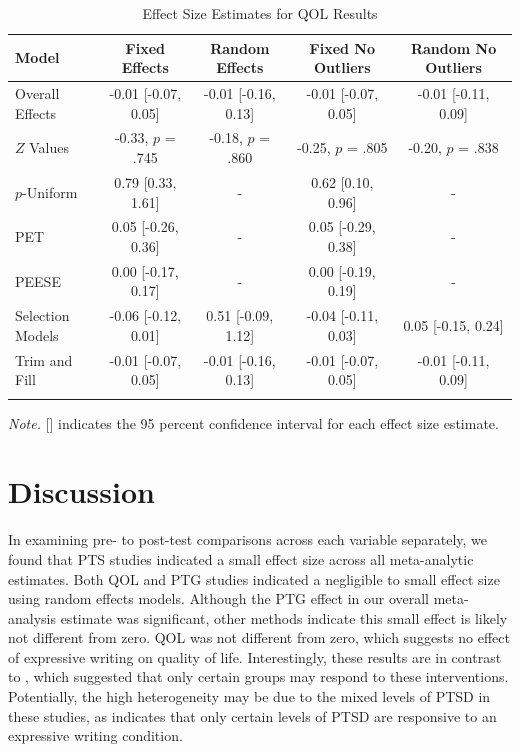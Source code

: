\documentclass[english,man]{apa6}
\theoremstyle{definition}
\theoremstyle{definition}
\theoremstyle{definition}
\theoremstyle{remark}
\begin{document}
\begin{table}[tbp]
\begin{center}
\begin{threeparttable}
\caption{\label{tab:QOLtable}Effect Size Estimates for QOL Results}
\small{
\begin{tabular}{lcccc}
\toprule
Model & Fixed Effects & Random Effects & Fixed No Outliers & Random No Outliers\\
\midrule
Overall Effects & -0.01 [-0.07, 0.05] & -0.01 [-0.16, 0.13] & -0.01 [-0.07, 0.05] & -0.01 [-0.11, 0.09]\\
$Z$ Values & -0.33, $p$ = .745 & -0.18, $p$ = .860 & -0.25, $p$ = .805 & -0.20, $p$ = .838\\
$p$-Uniform & 0.79 [0.33, 1.61] & - & 0.62 [0.10, 0.96] & -\\
PET & 0.05 [-0.26, 0.36] & - & 0.05 [-0.29, 0.38] & -\\
PEESE & 0.00 [-0.17, 0.17] & - & 0.00 [-0.19, 0.19] & -\\
Selection Models & -0.06 [-0.12, 0.01] & 0.51 [-0.09, 1.12] & -0.04 [-0.11, 0.03] & 0.05 [-0.15, 0.24]\\
Trim and Fill & -0.01 [-0.07, 0.05] & -0.01 [-0.16, 0.13] & -0.01 [-0.07, 0.05] & -0.01 [-0.11, 0.09]\\
\bottomrule
\addlinespace
\end{tabular}
}
\begin{tablenotes}[para]
\textit{Note.} [] indicates the 95 percent confidence interval for each effect size estimate.
\end{tablenotes}
\end{threeparttable}
\end{center}
\end{table}

\section{Discussion}\label{discussion}

In examining pre- to post-test comparisons across each variable
separately, we found that PTS studies indicated a small effect size
across all meta-analytic estimates. Both QOL and PTG studies indicated a
negligible to small effect size using random effects models. Although
the PTG effect in our overall meta-analysis estimate was significant,
other methods indicate this small effect is likely not different from
zero. QOL was not different from zero, which suggests no effect of
expressive writing on quality of life. Interestingly, these results are
in contrast to \textcite{Sloan2011a}, which suggested that only certain
groups may respond to these interventions. Potentially, the high
heterogeneity may be due to the mixed levels of PTSD in these studies,
as \textcite{Blasio2015a} indicates that only certain levels of PTSD are
responsive to an expressive writing condition.
\end{document}
